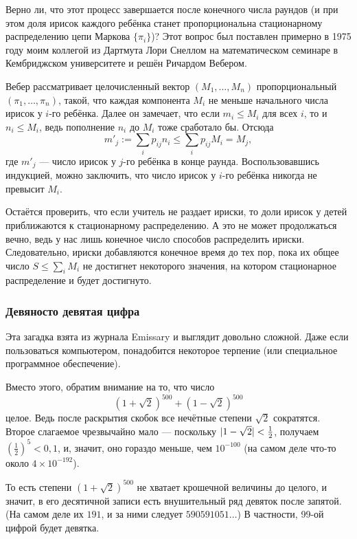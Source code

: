 Верно ли, что этот процесс завершается после конечного числа раундов
(и при этом доля ирисок каждого ребёнка станет пропорциональна стационарному распределению цепи Маркова $\{\pi_i\}$)?
Этот вопрос был поставлен примерно в 1975 году моим коллегой из Дартмута Лори Снеллом на математическом семинаре в Кембриджском университете и решён Ричардом Вебером.

Вебер рассматривает целочисленный вектор $(M_1, \dots , M_n)$ пропорциональный $(\pi_1, \dots , \pi_n)$, такой, что каждая компонента $M_i$ не меньше начального числа ирисок у $i$-го ребёнка.
Далее он замечает, что если $m_i \leqslant M_i$ для всех $i$, то и $n_i \leqslant M_i$, ведь пополнение $n_i$ до $M_i$ тоже сработало бы.
Отсюда 
\[m'_j
:=
\sum_i p_{ij} n_i
\leqslant
\sum_i p_{ij} M_i
=
M_j,\] где $m'_j$ --- число ирисок у $j$-го ребёнка в конце раунда.
Воспользовавшись индукцией, можно заключить, что число ирисок у $i$-го ребёнка никогда не превысит $M_i$.

Остаётся проверить, что если учитель не раздает ириски, то доли ирисок у детей приближаются к стационарному распределению.
А это не может продолжаться вечно, ведь у нас лишь конечное число способов распределить ириски.
Следовательно, ириски добавляются конечное время до тех пор, пока их общее число $S\leqslant\sum_iM_i$ не достигнет некоторого значения, на котором стационарное распределение и будет достигнуто.

\subsubsection*{Девяносто девятая цифра}

Эта загадка взята из журнала Emissary \cite[осень 1999]{3} и выглядит довольно сложной.
Даже если пользоваться компьютером, понадобится некоторое терпение (или специальное программное обеспечение).

Вместо этого, обратим внимание на то, что число
\[(1+\sqrt{2})^{500}+(1-\sqrt{2})^{500}\]
целое.
Ведь после раскрытия скобок все нечётные степени $\sqrt{2}$ сократятся.
Второе слагаемое чрезвычайно мало --- поскольку $|1-\sqrt{2}|\z<\tfrac12$, получаем $(\tfrac12)^5<0{,}1$, и, значит, оно гораздо меньше, чем $10^{-100}$ (на самом деле что-то около $4 \times 10^{-192}$).

То есть степени $(1+\sqrt{2})^{500}$ не хватает крошечной величины до целого, и значит, в его десятичной записи есть внушительный ряд девяток после запятой.
(На самом деле их $191$, и за ними следует $590591051\dots$)
В частности, 99-ой цифрой будет девятка.

